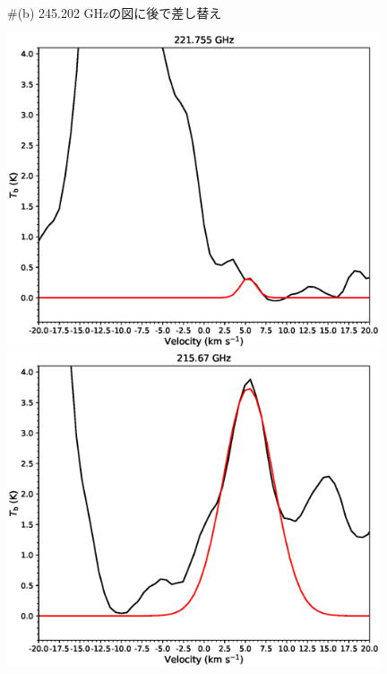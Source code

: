 \begin{figure}[H]
\begin{center}
\begin{minipage}{0.98\textwidth}
\begin{center}
\begin{minipage}{0.48\textwidth}
\begin{center}
\\ \#(b) 245.202 GHzの図に後で差し替え
\end{center}
\end{minipage}
\end{center}
\end{minipage}

\begin{minipage}{0.98\textwidth} 
\begin{center}
\begin{minipage}{0.48\textwidth}
\begin{center}
\includegraphics[width=0.98\textwidth]{OrionKL/spectrum/HC/221.755055w_fit.eps}
\end{center}
\end{minipage}
\begin{minipage}{0.48\textwidth}
\begin{center}
\includegraphics[width=0.98\textwidth]{OrionKL/spectrum/HC/215.6696452w_fit.eps}

\end{center}
\end{minipage}
\end{center}
\end{minipage}
\end{center}
\end{figure}
